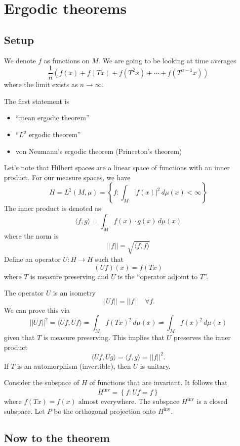 \documentclass{article}
\begin{document}
\section{Ergodic theorems}

\subsection{Setup}

We denote $f$ as functions on $M$. We are going to be looking at time averages 
\[
\frac{1}{n}\left(f(x) + f(Tx) + f(T^2x)+ \cdots + f(T^{n-1}x)\right)
\]
where the limit exists as $n\to\infty$.

The first statement is 
\begin{itemize}
    \item ``mean ergodic theorem''
    \item ``$L^2$ ergodic theorem''
    \item von Neumann's ergodic theorem (Princeton's theorem)
\end{itemize}
Let's note that Hilbert spaces are a linear space of functions with an inner product. For our measure spaces, we have 
\[
H=L^2\left(M,\mu\right) = \left\{ f: \int_M \left|f(x)\right|^2\, d\mu(x) < \infty \right\}
\]
The inner product is denoted as 
\[
\langle f,g \rangle = \int_M f(x) \cdot g(x) \, d\mu(x)
\]
where the norm is 
\[
\left|\left| f \right|\right| = \sqrt{\langle f, f \rangle}
\]
Define an operator $U: H\to H$ such that 
\[
\left( U f \right) (x) = f(Tx)
\]
where $T$ is measure preserving and $U$ is the ``operator adjoint to $T$''.

The operator $U$ is an isometry 
\[
\left|\left| U f \right|\right| = \left|\left| f \right|\right|\quad \forall f.
\]
We can prove this via 
\[
\left|\left| U f \right|\right|^2 = \langle Uf, Uf  \rangle = \int_M f(Tx)^2\, d\mu(x) = \int_M f(x)^2 \, d\mu(x)
\]
given that $T$ is measure preserving. This implies that $U$ preserves the inner product 
\[
\langle Uf, Ug \rangle = \langle f,g \rangle = \left|\left|f\right|\right|^2.
\]
If $T$ is an automorphism (invertible), then $U$ is unitary.

Consider the subspace of $H$ of functions that are invariant. It follows that 
\[
H^{\text{inv}} = \left\{ f: Uf=f \right\}
\]
where $f(Tx)=f(x)$ almost everywhere. The subspace $H^{\text{inv}}$ is a closed subspace. Let $P$ be the orthogonal projection onto $H^{\text{inv}}$.

\subsection{Now to the theorem}
\end{document}
